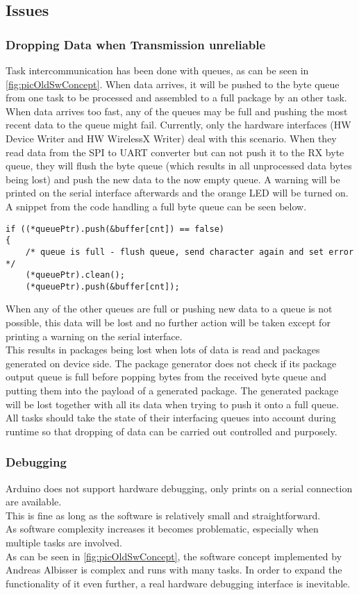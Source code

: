 \subsection{Issues}
%
\subsubsection{Dropping Data when Transmission unreliable}
Task intercommunication has been done with queues, as can be seen in \autoref{fig:picOldSwConcept}. When data arrives, it will be pushed to the byte queue from one task to be processed and assembled to a full package by an other task. \\
When data arrives too fast, any of the queues may be full and pushing the most recent data to the queue might fail. Currently, only the hardware interfaces (HW Device Writer and HW WirelessX Writer) deal with this scenario. When they read data from the SPI to UART converter but can not push it to the RX byte queue, they will flush the byte queue (which results in all unprocessed data bytes being lost) and push the new data to the now empty queue. A warning will be printed on the serial interface afterwards and the orange LED will be turned on. \\
A snippet from the code handling a full byte queue can be seen below.\\
\begin{lstlisting}
if ((*queuePtr).push(&buffer[cnt]) == false)
{
    /* queue is full - flush queue, send character again and set error */
    (*queuePtr).clean();
    (*queuePtr).push(&buffer[cnt]);
\end{lstlisting}
When any of the other queues are full or pushing new data to a queue is not possible, this data will be lost and no further action will be taken except for printing a warning on the serial interface.\\
This results in packages being lost when lots of data is read and packages generated on device side. The package generator does not check if its package output queue is full before popping bytes from the received byte queue and putting them into the payload of a generated package. The generated package will be lost together with all its data when trying to push it onto a full queue. \\
All tasks should take the state of their interfacing queues into account during runtime so that dropping of data can be carried out controlled and purposely.
%
\subsubsection{Debugging}
Arduino does not support hardware debugging, only prints on a serial connection are available.\\
This is fine as long as the software is relatively small and straightforward.\\
As software complexity increases it becomes problematic, especially when multiple tasks are involved.\\
As can be seen in \autoref{fig:picOldSwConcept}, the software concept implemented by Andreas Albisser is complex and runs with many tasks. In order to expand the functionality of it even further, a real hardware debugging interface is inevitable.
%

